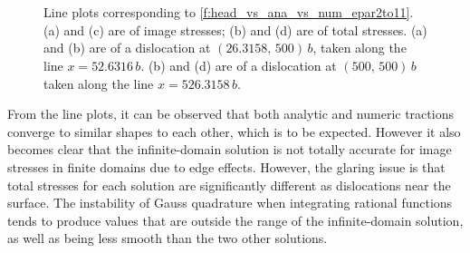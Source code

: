 \documentclass[11pt]{iopart}
\begin{document}
\begin{figure}
    \centering
    ~

    ~

    \caption{Line plots corresponding to \cref{f:head_vs_ana_vs_num_epar2to11}. (a) and (c) are of image stresses; (b) and (d) are of total stresses. (a) and (b) are of a dislocation at $(26.3158,\, 500)\, b$, taken along the line $x = 52.6316\, b$. (b) and (d) are of a dislocation at $(500,\, 500)\, b$ taken along the line $x = 526.3158\, b$.}
    \label{f:line_head_vs_ana_vs_num_epar2to11}
\end{figure}
From the line plots, it can be observed that both analytic and numeric tractions converge to similar shapes to each other, which is to be expected. However it also becomes clear that the infinite-domain solution is not totally accurate for image stresses in finite domains due to edge effects. However, the glaring issue is that total stresses for each solution are significantly different as dislocations near the surface. The instability of Gauss quadrature when integrating rational functions tends to produce values that are outside the range of the infinite-domain solution, as well as being less smooth than the two other solutions.
\end{document}
